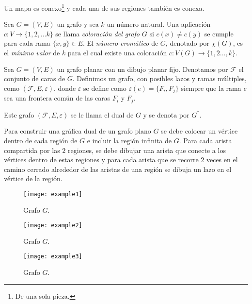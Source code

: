 \documentclass[3p,times,a4paper,twocolumn,authoryear]{elsarticle} %
\begin{document}
\begin{definition}
Un mapa es conexo\footnote{De una sola pieza.} y cada una de sus regiones también es conexa.
\end{definition}

\begin{definition} 
Sea $G=(V,E)$ un grafo y sea $k$ un número natural. Una aplicación $c\colon V\to \{1,2,\ldots k\}$ se llama \emph{\color{DarkBlue}coloración del grafo} $G$ si $c(x)\neq c(y)$ se cumple para cada rama $\{x,y\}\in E$. \linebreak El \emph{\color{DarkBlue}número cromático} de $G$, denotado por $\chi(G)$, es el \emph{\color{red}mínimo valor} de $k$ para el cual existe una coloración $c\colon V(G)\to\{1,2\ldots,k\}$.
\end{definition}

\begin{definition}
Sea $G=(V,E)$ un grafo planar con un dibujo planar fijo. Denotamos por $\mathcal{F}$ el conjunto de caras de $G$. Definimos un grafo, con posibles lazos y ramas múltiples, como $(\mathcal{F},E,\varepsilon)$, donde $\varepsilon$ se define como $\varepsilon(e)=\{F_i,F_j\}$ siempre que la rama $e$ sea una frontera común de las caras $F_i$ y $F_j$.

Este grafo $\left(\mathcal{F},E,\varepsilon\right)$ se le llama el dual de $G$ y se denota por $G^{\ast}$.	
\end{definition}

\begin{example}
Para construir una gráfica dual de un grafo plano $G$ se debe colocar un vértice dentro de cada región de $G$ e incluir la región infinita de $G$. Para cada arista compartida por las $2$ regiones, se debe dibujar una arista que conecte a los vértices dentro de estas regiones y para cada arista que se recorre $2$ veces en el camino cerrado alrededor de las aristas de una región se dibuja un lazo en el vértice de la región. 
\end{example}

\begin{figure}[H]
\centering
\texttt{[image: example1]}
\caption{Grafo $G$.}
\end{figure}

\begin{figure}[H]
	\centering
	\texttt{[image: example2]}
	\caption{Grafo $G$.}
\end{figure}

\begin{figure}[H]
	\centering
	\texttt{[image: example3]}
	\caption{Grafo $G$.}
\end{figure}
\end{document}
